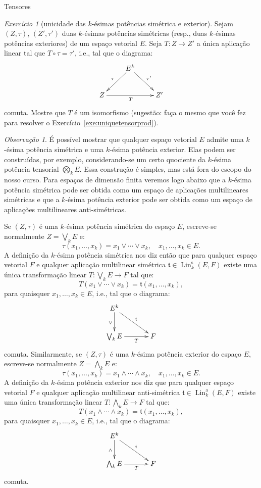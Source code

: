 \documentclass[oneside,11pt]{amsart}
\DeclareMathOperator{\Lin}{Lin}
\theoremstyle{remark}\newtheorem{exercise}{Exercício}[section]
\theoremstyle{plain}\newtheorem{teo}{Teorema}[section]
\theoremstyle{plain}\newtheorem{lem}[teo]{Lema}
\theoremstyle{plain}\newtheorem{prop}[teo]{Proposição}
\theoremstyle{definition}\newtheorem{defin}[teo]{Definição}
\theoremstyle{remark}\newtheorem{rem}[teo]{Observação}
\theoremstyle{definition}\newtheorem{example}[teo]{Exemplo}
\numberwithin{equation}{section}
\begin{document}
\begin{section}{Tensores}
\begin{exercise}[unicidade das $k$-ésimas potências simétrica e exterior]
Sejam $(Z,\tau)$, $(Z',\tau')$ duas $k$-ésimas potências simétricas (resp., duas $k$-ésimas potências exteriores) de um espaço vetorial $E$.
Seja $T:Z\to Z'$ a única aplicação linear tal que $T\circ\tau=\tau'$, i.e., tal que o diagrama:
\[\xymatrix{%
&E^k\ar[dl]_\tau\ar[dr]^{\tau'}\\
Z\ar[rr]_T&&Z'}\]
comuta. Mostre que $T$ é um isomorfismo (sugestão: faça o mesmo que você fez para resolver o Exercício~\ref{exe:uniquetensorprod}).
\end{exercise}

\begin{rem}
É possível mostrar que qualquer espaço vetorial $E$ admite uma $k$-ésima potência simétrica e uma $k$-ésima potência exterior. Elas podem ser construídas, por exemplo,
considerando-se um certo quociente da $k$-ésima potência tensorial $\bigotimes_kE$. Essa construção é simples, mas está fora do escopo do nosso curso.
Para espaços de dimensão finita veremos logo abaixo que a $k$-ésima potência simétrica pode ser obtida como um espaço de aplicações multilineares simétricas
e que a $k$-ésima potência exterior pode ser obtida como um espaço de aplicações multilineares anti-simétricas.
\end{rem}

Se $(Z,\tau)$ é uma $k$-ésima potência simétrica do espaço $E$, escreve-se normalmente $Z=\bigvee_kE$ e:
\[\tau(x_1,\ldots,x_k)=x_1\vee\cdots\vee x_k,\quad x_1,\ldots,x_k\in E.\]
A definição da $k$-ésima potência simétrica nos diz então que para qualquer espaço vetorial $F$ e qualquer aplicação multilinear simétrica
$\mathfrak t\in\Lin_k^{\mathrm s}(E,F)$ existe uma única transformação linear $T:\bigvee_kE\to F$ tal que:
\[T(x_1\vee\cdots\vee x_k)=\mathfrak t(x_1,\ldots,x_k),\]
para quaisquer $x_1,\ldots,x_k\in E$, i.e., tal que o diagrama:
\[\xymatrix@C+10pt{%
E^k\ar[dr]^{\mathfrak t}\ar[d]_\vee\\
\bigvee_kE\ar[r]_-T&F}\]
comuta. Similarmente, se $(Z,\tau)$ é uma $k$-ésima potência exterior do espaço $E$, escreve-se normalmente $Z=\bigwedge_kE$ e:
\[\tau(x_1,\ldots,x_k)=x_1\wedge\cdots\wedge x_k,\quad x_1,\ldots,x_k\in E.\]
A definição da $k$-ésima potência exterior nos diz que para qualquer espaço vetorial $F$ e qualquer aplicação multilinear anti-simétrica
$\mathfrak t\in\Lin_k^{\mathrm a}(E,F)$ existe uma única transformação linear $T:\bigwedge_kE\to F$ tal que:
\[T(x_1\wedge\cdots\wedge x_k)=\mathfrak t(x_1,\ldots,x_k),\]
para quaisquer $x_1,\ldots,x_k\in E$, i.e., tal que o diagrama:
\[\xymatrix@C+10pt{%
E^k\ar[dr]^{\mathfrak t}\ar[d]_\wedge\\
\bigwedge_kE\ar[r]_-T&F}\]
comuta.


\end{section}
\end{document}
